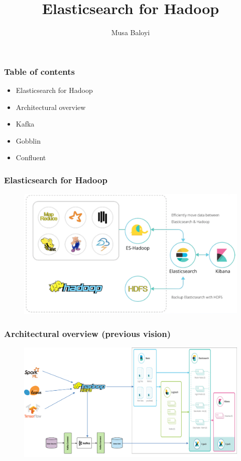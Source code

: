 \documentclass[11pt]{beamer}
\begin{document}
	\author{Musa Baloyi}
	\title{Elasticsearch for Hadoop}
	\begin{frame}[plain]
	\maketitle
\end{frame}

\begin{frame}
\frametitle{Table of contents}
\begin{itemize}
	\item Elasticsearch for Hadoop
	\item Architectural overview
	\item Kafka
	\item Gobblin
	\item Confluent
\end{itemize}
\end{frame}


\begin{frame}
\frametitle{Elasticsearch for Hadoop}
\begin{figure}[h]
\includegraphics[scale=.3]{images/es_hdp}
\end{figure}
\end{frame}

\begin{frame}
\frametitle{Architectural overview (previous vision)}
\begin{figure}[h]
\includegraphics[scale=.3]{images/arch1}
\end{figure}
\end{frame}
\end{document}
